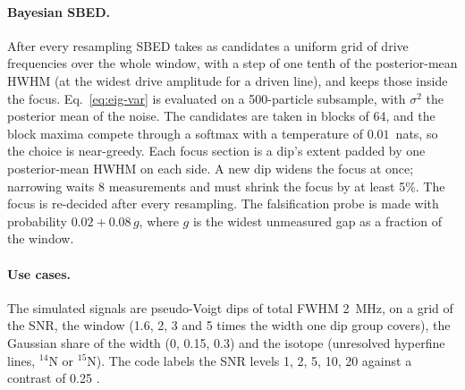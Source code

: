 \paragraph{Bayesian SBED.} After every resampling SBED takes as candidates a uniform grid of drive frequencies over the
whole window, with a step of one tenth of the posterior-mean HWHM (at the widest drive amplitude for a driven line),
and keeps those inside the focus. Eq.~\eqref{eq:eig-var} is evaluated on a 500-particle
subsample, with $\sigma^2$ the posterior mean of the noise. The candidates are taken in blocks of 64, and the block
maxima compete through a softmax with a temperature of $0.01$~nats, so the choice is near-greedy. Each focus section
is a dip's extent padded by one posterior-mean HWHM on each side. A new dip widens the focus at once; narrowing waits
8 measurements and must shrink the focus by at least 5\%. The focus is re-decided after every resampling. The
falsification probe is made with probability $0.02+0.08\,g$, where $g$ is the widest unmeasured gap as a fraction of
the window.

\paragraph{Use cases.} The simulated signals are pseudo-Voigt dips of total FWHM 2~MHz, on a grid of the SNR, the
window (1.6, 2, 3 and 5 times the width one dip group covers), the Gaussian share of the width (0, 0.15, 0.3) and the
isotope (unresolved hyperfine lines, $^{14}$N or $^{15}$N). The code labels the SNR levels 1, 2, 5, 10, 20 against a
contrast of 0.25 . 
